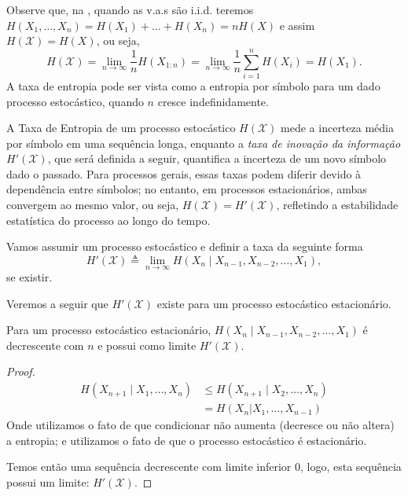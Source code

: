 Observe que, na , quando as v.a.s são i.i.d. teremos $H(X_1, \ldots, X_n) = H(X_1) + \ldots + H(X_n) = n H(X)$ e assim $H(\mathcal{X}) = H(X)$, ou seja,
\begin{equation}
  H(\mathcal{X}) = \lim_{n \rightarrow \infty} \frac{1}{n} H(X_{1:n}) = \lim_{n \rightarrow \infty} \frac{1}{n} \sum_{i=1}^n H(X_i) = H(X_1) .
\end{equation}
A taxa de entropia pode ser vista como a entropia por símbolo para um dado processo estocástico, quando $n$ cresce indefinidamente.



A Taxa de Entropia de um processo estocástico $H(\mathcal{X})$
mede a incerteza média por símbolo em uma sequência longa, 
enquanto a \emph{taxa de inovação da informação} $H'(\mathcal{X})$,
que será definida a seguir, quantifica a incerteza de um novo símbolo dado o passado. Para
processos gerais, essas taxas podem diferir devido à dependência entre
símbolos; no entanto, em processos estacionários, ambas
convergem ao mesmo valor, ou seja, $H(\mathcal{X}) = H'(\mathcal{X})$,
refletindo a estabilidade estatística do processo ao longo do tempo.

 \begin{definition}
  Vamos assumir um processo estocástico e definir a taxa da seguinte forma
  \begin{equation}
    H'(\mathcal{X}) \triangleq \lim_{n \rightarrow \infty} H(X_n \mid X_{n-1}, X_{n-2}, \ldots , X_1) ,
  \end{equation}
  se existir.
 \end{definition}
 Veremos a seguir que $H'(\mathcal{X})$ existe para um processo estocástico estacionário.

 \begin{theorem}
  Para um processo estocástico estacionário, $H(X_n \mid X_{n-1}, X_{n-2}, \ldots , X_1)$ é decrescente com $n$ e possui como limite $H'(\mathcal{X})$.
\end{theorem}
\begin{proof}
  \begin{subequations}
  \begin{align}
  H(X_{n+1} \mid X_1, \ldots, X_n) &\leq H(X_{n+1} \mid X_2, \ldots, X_n) \\
                &= H(X_n | X_1, \ldots, X_{n-1})
  \end{align}
  \end{subequations}
  Onde utilizamos o fato de que condicionar não aumenta (decresce ou não altera) a entropia;
  e utilizamos o fato de que o processo estocástico é estacionário.

  Temos então uma sequência decrescente com limite inferior $0$, logo, esta sequência possui um limite: $H'(\mathcal{X})$.
\end{proof}

